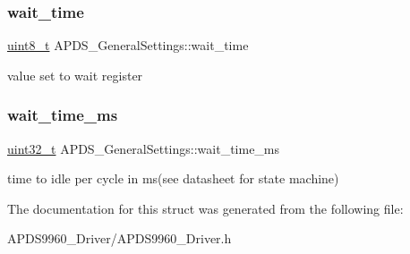 \subsubsection{\texorpdfstring{wait\+\_\+time}{wait\_time}}
{\footnotesize\ttfamily \hyperlink{vl53l0x__types_8h_aba7bc1797add20fe3efdf37ced1182c5}{uint8\+\_\+t} A\+P\+D\+S\+\_\+\+General\+Settings\+::wait\+\_\+time}

value set to wait register \mbox{\label{structAPDS__GeneralSettings_a01d37b5bd42dab254fd9701492784a03}} 
\subsubsection{\texorpdfstring{wait\+\_\+time\+\_\+ms}{wait\_time\_ms}}
{\footnotesize\ttfamily \hyperlink{vl53l0x__types_8h_a435d1572bf3f880d55459d9805097f62}{uint32\+\_\+t} A\+P\+D\+S\+\_\+\+General\+Settings\+::wait\+\_\+time\+\_\+ms}

time to idle per cycle in ms(see datasheet for state machine) 

The documentation for this struct was generated from the following file\+:\begin{DoxyCompactItemize}
\item 
A\+P\+D\+S9960\+\_\+\+Driver/A\+P\+D\+S9960\+\_\+\+Driver.\+h\end{DoxyCompactItemize}
